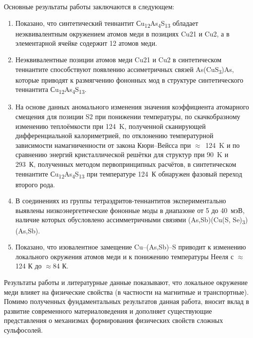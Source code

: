 Основные результаты работы заключаются в следующем:
% 
\begin{enumerate}
\item Показано, что синтетический теннантит Сu\textsubscript{12}As\textsubscript{4}S\textsubscript{13} обладает неэквивалентным  окружением атомов меди в позициях Cu21 и Cu2, а в элементарной ячейке содержит 12 атомов меди.
\item Неэквивалентные позиции атомов меди Cu21 и Cu2 в синтетическом теннантите способствуют появлению ассиметричных связей As(CuS\textsubscript{3})As, которые приводят к размягчению фононных мод в структуре синтетического теннантита Сu\textsubscript{12}As\textsubscript{4}S\textsubscript{13}.
\item На основе данных аномального изменения значения коэффициента атомарного смещения для позиции S2 при понижении температуры, по скачкобразному изменению теплоёмкости при 124~K, полученной сканирующей дифференциальной калориметрией, по отклонению температурной зависимости намагниченности от закона Кюри--Вейсса при $\approx$~124~K и по сравнению энергий кристаллической решётки для структур при 90~K и 293~К, полученных методом первопринципных расчётов, в синтетическом теннантите Сu\textsubscript{12}As\textsubscript{4}S\textsubscript{13} при температуре 124~К обнаружен фазовый переход второго рода.
\item В соединениях из группы тетраэдритов-теннантитов экспериментально выявлены низкоэнергетические фононные моды в диапазоне от 5 до 40~мэВ, наличие которых обусловлено  ассимметричными связями (As,Sb)(Cu(S, Se)\textsubscript{3})(As,Sb).
\item Показано, что изовалентное замещение Cu--(As,Sb)--S приводит к изменению локального окружения атомов меди и к понижению температуры Нееля с $\approx$124 К до $\approx$84 К.

\end{enumerate}

Результаты работы и литературные данные показывают, что локальное окружение меди влияет на физические свойства (в частности на магнитные и транспортные). Помимо полученных фундаментальных результатов данная работа, вносит вклад в развитие современного материаловедения и дополняет существующие представления о механизмах формирования физических свойств сложных сульфосолей.
